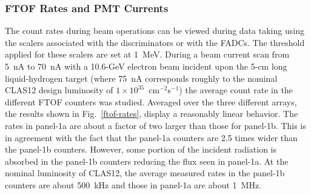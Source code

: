 \documentclass[3p,times,twocolumn]{elsarticle}
\begin{document}
\subsubsection{FTOF Rates and PMT Currents}

The count rates during beam operations can be viewed during data taking using the scalers associated
with the discriminators or with the FADCs. The threshold applied for these scalers are set at 1~MeV.
During a beam current scan from 5~nA to 70~nA with a 10.6-GeV electron beam incident upon the 5-cm long
liquid-hydrogen target (where 75~nA corresponds roughly to the nominal CLAS12 design luminosity of
$1 \times 10^{35}$~cm$^{-2}$s$^{-1}$) the average count rate in the different FTOF counters was studied.
Averaged over the three different arrays, the results shown in Fig.~\ref{ftof-rates}, display a reasonably
linear behavior. The rates in panel-1a are about a factor of two larger than those for panel-1b. This is in
agreement with the fact that the panel-1a counters are 2.5 times wider than the panel-1b counters. However,
some portion of the incident radiation is absorbed in the panel-1b counters reducing the flux seen in panel-1a.
At the nominal luminosity of CLAS12, the average measured rates in the panel-1b counters are about 500~kHz
and those in panel-1a are about 1~MHz.
\end{document}
